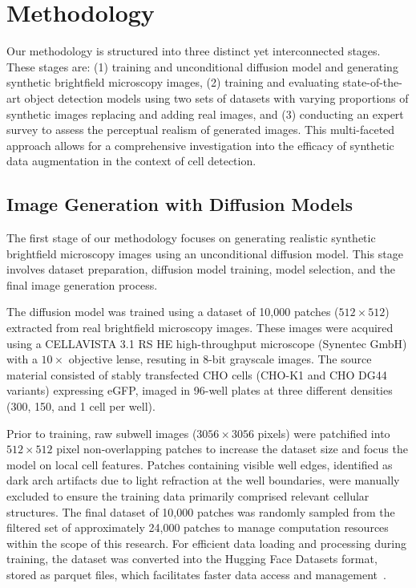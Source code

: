 \section{Methodology}
\label{sec:methodology}
Our methodology is structured into three distinct yet interconnected stages.
These stages are: (1) training and unconditional diffusion model and generating synthetic brightfield microscopy images, (2) training and evaluating state-of-the-art object detection models using two sets of datasets with varying proportions of synthetic images replacing and adding real images, and
(3) conducting an expert survey to assess the perceptual realism of generated images.
This multi-faceted approach allows for a comprehensive investigation into the efficacy of synthetic data augmentation in the context of cell detection.

\subsection{Image Generation with Diffusion Models}
\label{subsec:image-generation-with-diffusion-models}
The first stage of our methodology focuses on generating realistic synthetic brightfield microscopy images using an unconditional diffusion model.
This stage involves dataset preparation, diffusion model training, model selection, and the final image generation process.

The diffusion model was trained using a dataset of 10,000 patches ($512 \times 512$) extracted from real brightfield microscopy images.
These images were acquired using a CELLAVISTA 3.1 RS HE high-throughput microscope (Synentec GmbH) with a $10\times$ objective lense, resuting in 8-bit grayscale images.
The source material consisted of stably transfected CHO cells (CHO-K1 and CHO DG44 variants) expressing eGFP, imaged in 96-well plates at three different densities (300, 150, and 1 cell per well).

Prior to training, raw subwell images ($3056 \times 3056$ pixels) were patchified into $512 \times 512$ pixel non-overlapping patches to increase the dataset size and focus the model on local cell features.
Patches containing visible well edges, identified as dark arch artifacts due to light refraction at the well boundaries, were manually excluded to ensure the training data primarily comprised relevant cellular structures.
The final dataset of 10,000 patches was randomly sampled from the filtered set of approximately 24,000 patches to manage computation resources within the scope of this research.
For efficient data loading and processing during training, the dataset was converted into the Hugging Face Datasets format, stored as parquet files, which facilitates faster data access and management~\cite{vohra_apache_2016}.


